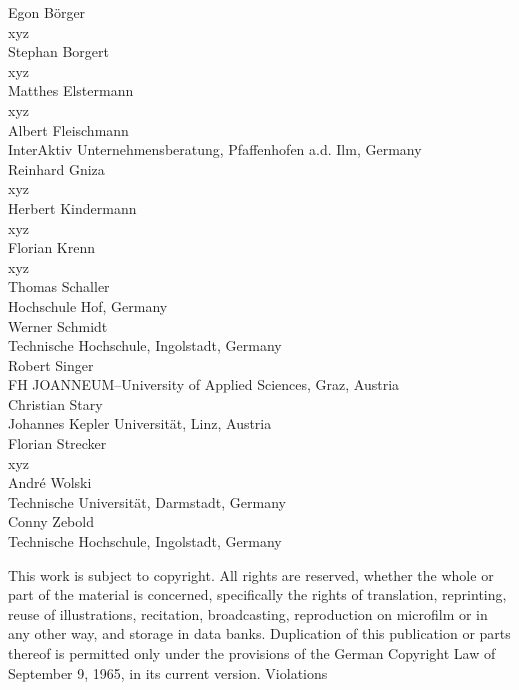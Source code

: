 \documentclass[11pt, showtrims, final, oldfontcommands]{memoir}
\begin{document}
\begingroup
\footnotesize
\setlength{\parindent}{0pt}
\setlength{\parskip}{\baselineskip}
\vspace*{3cm}
\begin{flushleft}
	Egon B\"orger\\
	xyz\\
	\medskip
	Stephan Borgert\\
	xyz\\
	\medskip
	Matthes Elstermann\\
	xyz\\
	\medskip
	Albert Fleischmann\\
	InterAktiv Unternehmensberatung, Pfaffenhofen a.d. Ilm, Germany\\
	\medskip
	Reinhard Gniza\\
	xyz\\
	\medskip
	Herbert Kindermann\\
	xyz\\
	\medskip
	Florian Krenn\\
	xyz\\
	\medskip
	Thomas Schaller\\
	Hochschule Hof, Germany\\
	\medskip
	Werner Schmidt\\
	Technische Hochschule, Ingolstadt, Germany\\
	\medskip
	Robert Singer\\
	FH JOANNEUM--University of Applied Sciences, Graz, Austria\\
	\medskip
	Christian Stary\\
	Johannes Kepler Universit\"at, Linz, Austria\\
	\medskip
	Florian Strecker\\
	xyz\\
	\medskip
	Andr\'e Wolski\\
	Technische Universit\"at, Darmstadt, Germany\\
	\medskip
	Conny Zebold\\
	Technische Hochschule, Ingolstadt, Germany\\
\end{flushleft}
\vspace*{\fill}
This work is subject to copyright. All rights are reserved, whether the whole or part of the material is concerned, specifically the rights of translation, reprinting, reuse of illustrations, recitation, broadcasting, reproduction on microfilm or in any other way, and storage in data banks. Duplication of this publication or parts thereof is permitted only under the provisions of the German Copyright Law of September 9, 1965, in its current version. Violations
\end{document}
